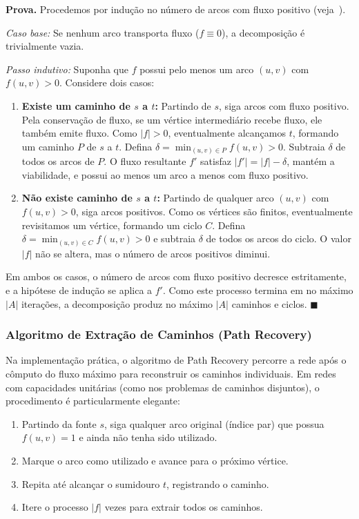 \documentclass[12pt,a4paper]{article}
\begin{document}
\textbf{Prova.}
Procedemos por indução no número de arcos com fluxo positivo (veja~\cite{ahuja1993network}).

\textit{Caso base:} Se nenhum arco transporta fluxo ($f \equiv 0$), a decomposição é trivialmente vazia.

\textit{Passo indutivo:} Suponha que $f$ possui pelo menos um arco $(u,v)$ com $f(u,v) > 0$. Considere dois casos:

\begin{enumerate}
    \item \textbf{Existe um caminho de $s$ a $t$:} Partindo de $s$, siga arcos com fluxo positivo. Pela conservação de fluxo, se um vértice intermediário recebe fluxo, ele também emite fluxo. Como $|f| > 0$, eventualmente alcançamos $t$, formando um caminho $P$ de $s$ a $t$. Defina $\delta = \min_{(u,v) \in P} f(u,v) > 0$. Subtraia $\delta$ de todos os arcos de $P$. O fluxo resultante $f'$ satisfaz $|f'| = |f| - \delta$, mantém a viabilidade, e possui ao menos um arco a menos com fluxo positivo.

    \item \textbf{Não existe caminho de $s$ a $t$:} Partindo de qualquer arco $(u,v)$ com $f(u,v) > 0$, siga arcos positivos. Como os vértices são finitos, eventualmente revisitamos um vértice, formando um ciclo $C$. Defina $\delta = \min_{(u,v) \in C} f(u,v) > 0$ e subtraia $\delta$ de todos os arcos do ciclo. O valor $|f|$ não se altera, mas o número de arcos positivos diminui.
\end{enumerate}

Em ambos os casos, o número de arcos com fluxo positivo decresce estritamente, e a hipótese de indução se aplica a $f'$. Como este processo termina em no máximo $|A|$ iterações, a decomposição produz no máximo $|A|$ caminhos e ciclos. $\blacksquare$

\subsubsection{Algoritmo de Extração de Caminhos (Path Recovery)}

Na implementação prática, o algoritmo de Path Recovery percorre a rede após o cômputo do fluxo máximo para reconstruir os caminhos individuais. Em redes com capacidades unitárias (como nos problemas de caminhos disjuntos), o procedimento é particularmente elegante:

\begin{enumerate}
    \item Partindo da fonte $s$, siga qualquer arco original (índice par) que possua $f(u,v) = 1$ e ainda não tenha sido utilizado.
    \item Marque o arco como utilizado e avance para o próximo vértice.
    \item Repita até alcançar o sumidouro $t$, registrando o caminho.
    \item Itere o processo $|f|$ vezes para extrair todos os caminhos.
\end{enumerate}
\end{document}
